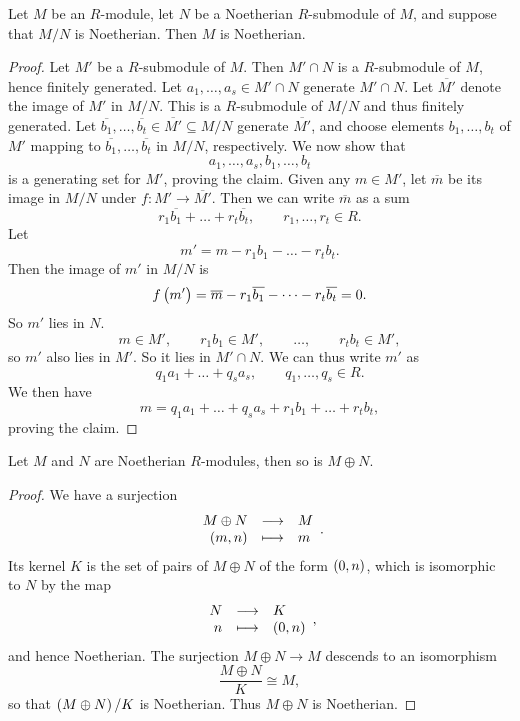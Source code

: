\pagebreak

\begin{proposition}
Let $ M $ be an $ R $-module, let $ N $ be a Noetherian $ R $-submodule of $ M $, and suppose that $ M / N $ is Noetherian. Then $ M $ is Noetherian.
\end{proposition}

\begin{proof}
Let $ M' $ be a $ R $-submodule of $ M $. Then $ M' \cap N $ is a $ R $-submodule of $ M $, hence finitely generated. Let $ a_1, \dots, a_s \in M' \cap N $ generate $ M' \cap N $. Let $ \overline{M'} $ denote the image of $ M' $ in $ M / N $. This is a $ R $-submodule of $ M / N $ and thus finitely generated. Let $ \overline{b_1}, \dots, \overline{b_t} \in \overline{M'} \subseteq M / N $ generate $ \overline{M'} $, and choose elements $ b_1, \dots, b_t $ of $ M' $ mapping to $ \overline{b_1}, \dots, \overline{b_t} $ in $ M / N $, respectively. We now show that
$$ a_1, \dots, a_s, b_1, \dots, b_t $$
is a generating set for $ M' $, proving the claim. Given any $ m \in M' $, let $ \overline{m} $ be its image in $ M / N $ under $ f : M' \to \overline{M'} $. Then we can write $ \overline{m} $ as a sum
$$ r_1\overline{b_1} + \dots + r_t\overline{b_t}, \qquad r_1, \dots, r_t \in R. $$
Let
$$ m' = m - r_1b_1 - \dots - r_tb_t. $$
Then the image of $ m' $ in $ M / N $ is
$$ f\br{m'} = \overline{m} - r_1\overline{b_1} - \dots - r_t\overline{b_t} = 0. $$
So $ m' $ lies in $ N $.
$$ m \in M', \qquad r_1b_1 \in M', \qquad \dots, \qquad r_tb_t \in M', $$
so $ m' $ also lies in $ M' $. So it lies in $ M' \cap N $. We can thus write $ m' $ as
$$ q_1a_1 + \dots + q_sa_s, \qquad q_1, \dots, q_s \in R. $$
We then have
$$ m = q_1a_1 + \dots + q_sa_s + r_1b_1 + \dots + r_tb_t, $$
proving the claim.
\end{proof}

\begin{corollary}
Let $ M $ and $ N $ are Noetherian $ R $-modules, then so is $ M \oplus N $.
\end{corollary}

\begin{proof}
We have a surjection
$$ \function{M \oplus N}{M}{\br{m, n}}{m}. $$
Its kernel $ K $ is the set of pairs of $ M \oplus N $ of the form $ \br{0, n} $, which is isomorphic to $ N $ by the map
$$ \function{N}{K}{n}{\br{0, n}}, $$
and hence Noetherian. The surjection $ M \oplus N \to M $ descends to an isomorphism
$$ \dfrac{M \oplus N}{K} \cong M, $$
so that $ \br{M \oplus N} / K $ is Noetherian. Thus $ M \oplus N $ is Noetherian.
\end{proof}

